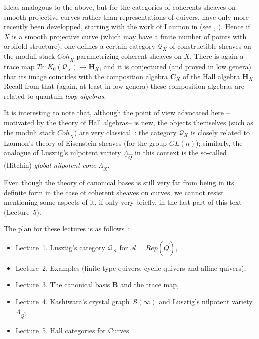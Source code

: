 \documentclass[a4paper,10pt]{amsart}
\def\A{\mathcal{A}}
\numberwithin{equation}{section}
\begin{document}
\vspace{.2in}

Ideas analogous to the above, but for the categories of coherents sheaves on smooth projective curves rather than representations of quivers, have only more recently been developped, starting with the work of Laumon in \cite{Laumon} (see \cite{SInvent}, \cite{Scano}). Hence if $X$ is a smooth projective curve (which may have a finite number of points with orbifold structure), one defines a certain category 
$\mathcal{Q}_{X}$ of constructible sheaves on the moduli stack $\underline{Coh}_X$ parametrizing coherent sheaves on $X$. There is again a trace map $Tr : K_0(\mathcal{Q}_{X}) \to \mathbf{H}_X$, and it is conjectured (and proved in low genera) that its image coincides with the composition algebra $\mathbf{C}_X$ of the Hall algebra $\mathbf{H}_X$. Recall from \cite{Trieste} that (again, at least in low genera) these composition algebras are related to quantum \textit{loop algebras}.

It is interesting to note that, although the point of view advocated here --motivated by the theory of Hall algebras-- is new, the objects themselves (such as the moduli stack $\underline{Coh}_X$) are very classical~: the category $\mathcal{Q}_X$ is closely related to Laumon's theory of Eisenstein sheaves (for the group $GL(n)$); similarly, the analogue of Lusztig's nilpotent variety $\underline{\Lambda}_{\vec{Q}}$ in this context is the so-called (Hitchin) \textit{global nilpotent cone} $\underline{\Lambda}_X$.

Even though the theory of canonical bases is still very far from being in its definite form in the case of coherent sheaves on curves, we cannot resist mentioning some aspects of it, if only very briefly, in the last part of this text (Lecture~5).

\vspace{.2in}

The plan for these lectures is as follows~:

\begin{itemize}
\item Lecture~1. Lusztig's category $\mathcal{Q}_{\A}$ for $\mathcal{A}=Rep(\vec{Q})$,

\vspace{.03in}

\item Lecture~2. Examples  (finite type quivers, cyclic quivers and affine quivers),

\vspace{.03in}

\item Lecture~3.  The canonical basis $\mathbf{B}$ and the trace map,

\vspace{.03in}

\item Lecture~4. Kashiwara's crystal graph $\mathcal{B}(\infty)$ and Lusztig's nilpotent variety $\underline{\Lambda}_{\vec{Q}}$,

\vspace{.03in}

\item Lecture~5.  Hall categories for Curves.
\end{itemize}
\end{document}
